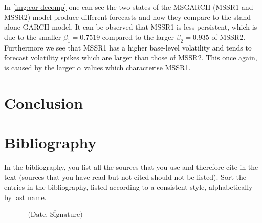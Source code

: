\documentclass[11pt,a4paper]{article}
\begin{document}
In \cref{img:cor-decomp} one can see the two states of the MSGARCH (MSSR1 and MSSR2) model produce different forecasts and how they compare to the stand-alone GARCH model. 
It can be observed that MSSR1 is less persistent, which is due to the smaller $\beta_1 = 0.7519$ compared to the larger $\beta_2 = 0.935$ of MSSR2.
Furthermore we see that MSSR1 has a higher base-level volatility and tends to forecast volatility spikes which are larger than those of MSSR2. This once again, is caused by the larger $\alpha$ values which characterise MSSR1.

\section{Conclusion}


\newpage


\pagestyle{fancy}						
\fancyhf{}								
\fancyhead[R]{}							 
\renewcommand{\headrulewidth}{0pt}	 
\fancyfoot[R]{\thepage}				 
\renewcommand{\footrulewidth}{0pt}	 
\setcounter{page}{5}
\newpage\clearpage

\newpage
{}
\section*{Bibliography}
In the bibliography, you list all the sources that you use and therefore cite in the text (sources that you have read but not cited should not be listed). Sort the entries in the bibliography, listed according to a consistent style, alphabetically by last name.





\newpage

\begin{flushright}
$\overline{~~~~~~~~~~~~~~~\mbox{(Date, Signature)}~~~~~~~~~~~~~~~}$
\end{flushright}
\end{document}
